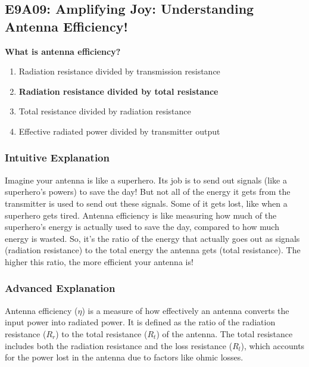 \subsection{E9A09: Amplifying Joy: Understanding Antenna Efficiency!}

\begin{tcolorbox}[colback=gray!10!white,colframe=black!75!black,title=\textbf{Question E9A09}]
\textbf{What is antenna efficiency?}
\begin{enumerate}[label=\Alph*),noitemsep]
    \item Radiation resistance divided by transmission resistance
    \item \textbf{Radiation resistance divided by total resistance}
    \item Total resistance divided by radiation resistance
    \item Effective radiated power divided by transmitter output
\end{enumerate}
\end{tcolorbox}

\subsubsection{Intuitive Explanation}
Imagine your antenna is like a superhero. Its job is to send out signals (like a superhero's powers) to save the day! But not all of the energy it gets from the transmitter is used to send out these signals. Some of it gets lost, like when a superhero gets tired. Antenna efficiency is like measuring how much of the superhero's energy is actually used to save the day, compared to how much energy is wasted. So, it's the ratio of the energy that actually goes out as signals (radiation resistance) to the total energy the antenna gets (total resistance). The higher this ratio, the more efficient your antenna is!

\subsubsection{Advanced Explanation}
Antenna efficiency (\(\eta\)) is a measure of how effectively an antenna converts the input power into radiated power. It is defined as the ratio of the radiation resistance (\(R_r\)) to the total resistance (\(R_t\)) of the antenna. The total resistance includes both the radiation resistance and the loss resistance (\(R_l\)), which accounts for the power lost in the antenna due to factors like ohmic losses.

